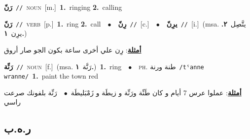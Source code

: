 \documentclass[10pt,a4paper,twoside]{article} %
\begin{document}
\begin{multicols}{2}
{\setlength\topsep{0pt}\textbf{\foreignlanguage{arabic}{رَنّ}}\ {\color{gray}\texttt{//}\color{black}}\ \textsc{noun}\ [m.]\ \textbf{1.}~ringing  \textbf{2.}~calling\ } \vspace{2mm}

{\setlength\topsep{0pt}\textbf{\foreignlanguage{arabic}{رَنّ}}\ {\color{gray}\texttt{//}\color{black}}\ \textsc{verb}\ [p.]\ \textbf{1.}~ring  \textbf{2.}~call\ \ $\bullet$\ \ \setlength\topsep{0pt}\textbf{\foreignlanguage{arabic}{رِنّ}}\ {\color{gray}\texttt{//}\color{black}}\ [c.]\ \ $\bullet$\ \ \setlength\topsep{0pt}\textbf{\foreignlanguage{arabic}{يرِنّ}}\ {\color{gray}\texttt{//}\color{black}}\ [i.]\ \color{gray}(msa. \foreignlanguage{arabic}{يتَّصِل}~\foreignlanguage{arabic}{\textbf{٢.}}  \foreignlanguage{arabic}{يرِن}~\foreignlanguage{arabic}{\textbf{١.}})\color{black}\  \begin{flushright}\color{gray}\foreignlanguage{arabic}{\textbf{\underline{\foreignlanguage{arabic}{أمثلة}}}: رِن علي أخرى ساعة بكون الجو صار أروق}\end{flushright}\color{black}} \vspace{2mm}

{\setlength\topsep{0pt}\textbf{\foreignlanguage{arabic}{رَنِّة}}\ {\color{gray}\texttt{//}\color{black}}\ \textsc{noun}\ [f.]\ \color{gray}(msa. \foreignlanguage{arabic}{رَنَّة}~\foreignlanguage{arabic}{\textbf{١.}})\color{black}\ \textbf{1.}~ring\ \ $\bullet$\ \ \textsc{ph.} \color{gray} \foreignlanguage{arabic}{طنة ورنة}\color{black}\ {\color{gray}\texttt{/{\sffamily tˤanne wranne}/}\color{black}}\ \textbf{1.}~paint the town red\  \begin{flushright}\color{gray}\foreignlanguage{arabic}{\textbf{\underline{\foreignlanguage{arabic}{أمثلة}}}: عملوا عرس 7 أيام و كان طَنِّة ورَنِّة و زيطَة و زَمْبَليطَة\ $\bullet$\ \  رَنِّة بلفونك صرعت راسي}\end{flushright}\color{black}} \vspace{2mm}

\vspace{-3mm}
\subsection*{\color{blue}\foreignlanguage{arabic}{ر.ه.ب}\color{blue}{}} 


\end{multicols}
\end{document}
